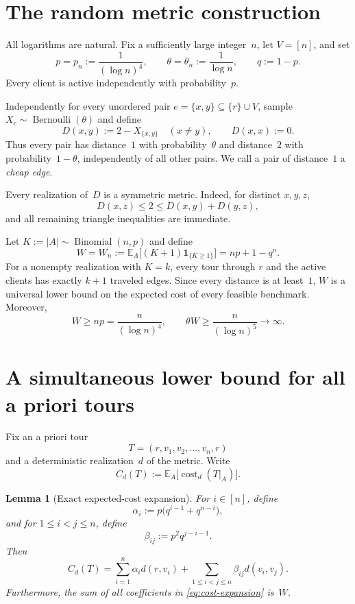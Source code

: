 \documentclass[11pt]{article}
\newtheorem{lemma}[theorem]{Lemma}
\theoremstyle{remark}
\newcommand{\E}{\mathbb{E}}
\newcommand{\one}{\mathbf{1}}
\newcommand{\cost}{\operatorname{cost}}
\begin{document}
\section{The random metric construction}

All logarithms are natural.  Fix a sufficiently large integer~$n$, let
$V=[n]$, and set
\[
    p=p_n:=\frac{1}{(\log n)^4},
    \qquad
    \theta=\theta_n:=\frac{1}{\log n},
    \qquad
    q:=1-p.
\]
Every client is active independently with probability~$p$.

Independently for every unordered pair
$e=\{x,y\}\subseteq\{r\}\cup V$, sample $X_e\sim\operatorname{Bernoulli}(\theta)$
and define
\[
    D(x,y):=2-X_{\{x,y\}}
    \quad (x\neq y),
    \qquad
    D(x,x):=0.
\]
Thus every pair has distance~$1$ with probability~$\theta$ and distance~$2$
with probability~$1-\theta$, independently of all other pairs.  We call a
pair of distance~$1$ a \emph{cheap edge}.

Every realization of~$D$ is a symmetric metric.  Indeed, for distinct
$x,y,z$,
\[
    D(x,z)\leq 2\leq D(x,y)+D(y,z),
\]
and all remaining triangle inequalities are immediate.

Let $K:=|A|\sim\operatorname{Binomial}(n,p)$ and define
\[
    W=W_n
    :=\E_A\bigl[(K+1)\one_{\{K\geq1\}}\bigr]
    =np+1-q^n.
\]
For a nonempty realization with $K=k$, every tour through $r$ and the active
clients has exactly $k+1$ traveled edges.  Since every distance is at least~$1$,
$W$ is a universal lower bound on the expected cost of every feasible
benchmark.  Moreover,
\[
    W\geq np=\frac{n}{(\log n)^4},
    \qquad
    \theta W\geq\frac{n}{(\log n)^5}\longrightarrow\infty.
\]

\section{A simultaneous lower bound for all a priori tours}

Fix an a priori tour
\[
    T=(r,v_1,v_2,\ldots,v_n,r)
\]
and a deterministic realization~$d$ of the metric.  Write
\[
    C_d(T):=\E_A\bigl[\cost_d(T|_A)\bigr].
\]

\begin{lemma}[Exact expected-cost expansion]\label{lem:expansion}
For $i\in[n]$, define
\[
    \alpha_i:=p\bigl(q^{i-1}+q^{n-i}\bigr),
\]
and for $1\leq i<j\leq n$, define
\[
    \beta_{ij}:=p^2q^{j-i-1}.
\]
Then
\begin{equation}\label{eq:cost-expansion}
    C_d(T)
    =
    \sum_{i=1}^n \alpha_i d(r,v_i)
    +
    \sum_{1\leq i<j\leq n}\beta_{ij}d(v_i,v_j).
\end{equation}
Furthermore, the sum of all coefficients in \eqref{eq:cost-expansion} is~$W$.
\end{lemma}
\end{document}

